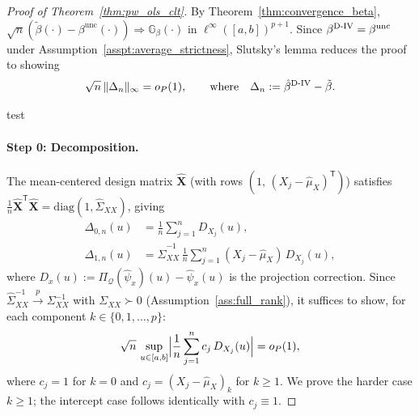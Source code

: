 \documentclass[12pt]{article}
\newcommand{\T}{\mathsf{T}} %
\newcommand{\est}{\ensuremath{\textnormal{D-IV}}\xspace}
\newcommand{\PiQ}{\Pi_{\mathcal{Q}}} %
\newcommand{\toP}{ \overset{p}{\to}}
\begin{document}
\begin{proof}[Proof of Theorem~\ref{thm:pw_ols_clt}]

By Theorem~\ref{thm:convergence_beta}, $\sqrt{n}(\tilde\beta(\cdot)-\beta^{\mathrm{unc}}(\cdot))\Rightarrow\mathbb{G}_\beta(\cdot)$ in $\ell^\infty([a,b])^{p+1}$. Since $\beta^{\est}=\beta^{\mathrm{unc}}$ under Assumption~\ref{asspt:average_strictness}, Slutsky's lemma reduces the proof to showing
\begin{equation}\label{eq:main_goal_pf}
\sqrt{n}\,\|\Delta_n\|_\infty = o_P(1),
\qquad\text{where}\quad
\Delta_n := \hat\beta^{\est}-\tilde\beta.
\end{equation}

test
 
\paragraph{Step 0: Decomposition.}
The mean-centered design matrix $\hat{\mathbf{X}}$ (with rows $(1,\,(X_j-\hat\mu_X)^{\!\T})$) satisfies $\frac{1}{n}\hat{\mathbf{X}}^{\!\T}\hat{\mathbf{X}}=\mathrm{diag}(1,\hat\Sigma_{XX})$, giving
\begin{align}
\Delta_{0,n}(u) &= \frac{1}{n}\sum_{j=1}^n D_{X_j}(u), \label{eq:Delta0_pf}\\[3pt]
\Delta_{1,n}(u) &= \hat\Sigma_{XX}^{-1}\,\frac{1}{n}\sum_{j=1}^n (X_j-\hat\mu_X)\,D_{X_j}(u), \label{eq:Delta1_pf}
\end{align}
where $D_x(u):=\PiQ(\hat\psi_x)(u)-\hat\psi_x(u)$ is the projection correction. Since $\hat\Sigma_{XX}^{-1}\toP\Sigma_{XX}^{-1}$ with $\Sigma_{XX}\succ 0$ (Assumption~\ref{ass:full_rank}), it suffices to show, for each component $k\in\{0,1,\dots,p\}$:
\begin{equation}\label{eq:Wk_pf}
\sqrt{n}\,\sup_{u\in[a,b]}\Bigl|\frac{1}{n}\sum_{j=1}^n c_j\,D_{X_j}(u)\Bigr|=o_P(1),
\end{equation}
where $c_j=1$ for $k=0$ and $c_j=(X_j-\hat\mu_X)_k$ for $k\ge 1$. We prove the harder case $k\ge 1$; the intercept case follows identically with $c_j\equiv 1$.
 

\end{proof}
\end{document}
